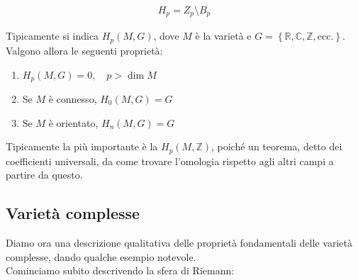 \documentclass{report}
\begin{document}
\begin{align}
    H_p = Z_p \setminus B_p
\end{align}

Tipicamente si indica \(H_p(M, G)\), dove \(M\) è la varietà e \(G = \left\{\mathbb{R}, \mathbb{C}, \mathbb{Z}, \text{ecc.} \right\}\). Valgono allora le seguenti proprietà: 

\begin{enumerate}
    \item \(H_p (M, G) = 0, \quad p> \dim M\) 
    \item Se \(M\) è connesso, \(H_0(M, G) = G\) 
    \item Se \(M\) è orientato, \(H_n(M, G) = G\)
\end{enumerate}

Tipicamente la più importante è la \(H_p(M, \mathbb{Z})\), poiché un teorema, detto dei coefficienti universali, da come trovare l'omologia rispetto agli altri campi a partire da questo. 

\subsection{Varietà complesse}

Diamo ora una descrizione qualitativa delle proprietà fondamentali delle varietà complesse, dando qualche esempio notevole. \\

Cominciamo subito descrivendo la sfera di Riemann: 
\end{document}
